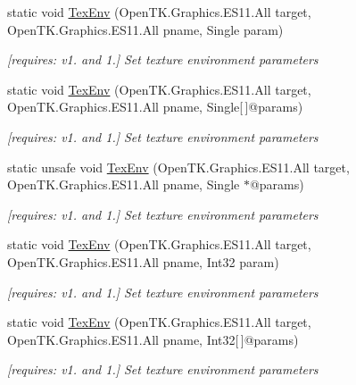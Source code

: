 \begin{DoxyCompactItemize}
static void \hyperlink{class_open_t_k_1_1_graphics_1_1_e_s11_1_1_g_l_a4227e98e993332f5e9e2ea5730a3d79a}{Tex\-Env} (Open\-T\-K.\-Graphics.\-E\-S11.\-All target, Open\-T\-K.\-Graphics.\-E\-S11.\-All pname, Single param)
\begin{DoxyCompactList}\small\item\em \mbox{[}requires\-: v1. and 1.\mbox{]} Set texture environment parameters \end{DoxyCompactList}\item 
static void \hyperlink{class_open_t_k_1_1_graphics_1_1_e_s11_1_1_g_l_a6c089e89975c3db48b0c9f9a2c045d0a}{Tex\-Env} (Open\-T\-K.\-Graphics.\-E\-S11.\-All target, Open\-T\-K.\-Graphics.\-E\-S11.\-All pname, Single\mbox{[}$\,$\mbox{]}@params)
\begin{DoxyCompactList}\small\item\em \mbox{[}requires\-: v1. and 1.\mbox{]} Set texture environment parameters \end{DoxyCompactList}\item 
static unsafe void \hyperlink{class_open_t_k_1_1_graphics_1_1_e_s11_1_1_g_l_a35fd06b1e68fe6f9fde2f5e21927ff21}{Tex\-Env} (Open\-T\-K.\-Graphics.\-E\-S11.\-All target, Open\-T\-K.\-Graphics.\-E\-S11.\-All pname, Single $\ast$@params)
\begin{DoxyCompactList}\small\item\em \mbox{[}requires\-: v1. and 1.\mbox{]} Set texture environment parameters \end{DoxyCompactList}\item 
static void \hyperlink{class_open_t_k_1_1_graphics_1_1_e_s11_1_1_g_l_a722d1356261b5ac898de42bf29f4dd12}{Tex\-Env} (Open\-T\-K.\-Graphics.\-E\-S11.\-All target, Open\-T\-K.\-Graphics.\-E\-S11.\-All pname, Int32 param)
\begin{DoxyCompactList}\small\item\em \mbox{[}requires\-: v1. and 1.\mbox{]} Set texture environment parameters \end{DoxyCompactList}\item 
static void \hyperlink{class_open_t_k_1_1_graphics_1_1_e_s11_1_1_g_l_a249adccc9452df5f0d3a4d6c5dbbd20c}{Tex\-Env} (Open\-T\-K.\-Graphics.\-E\-S11.\-All target, Open\-T\-K.\-Graphics.\-E\-S11.\-All pname, Int32\mbox{[}$\,$\mbox{]}@params)
\begin{DoxyCompactList}\small\item\em \mbox{[}requires\-: v1. and 1.\mbox{]} Set texture environment parameters \end{DoxyCompactList}\item 

\end{DoxyCompactItemize}
